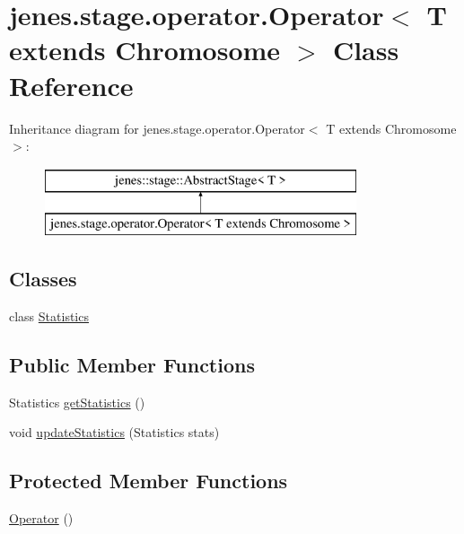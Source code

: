 \hypertarget{classjenes_1_1stage_1_1operator_1_1_operator_3_01_t_01extends_01_chromosome_01_4}{\section{jenes.\-stage.\-operator.\-Operator$<$ T extends Chromosome $>$ Class Reference}
\label{classjenes_1_1stage_1_1operator_1_1_operator_3_01_t_01extends_01_chromosome_01_4}
}
Inheritance diagram for jenes.\-stage.\-operator.\-Operator$<$ T extends Chromosome $>$\-:\begin{figure}[H]
\begin{center}
\leavevmode
\includegraphics[height=2.000000cm]{classjenes_1_1stage_1_1operator_1_1_operator_3_01_t_01extends_01_chromosome_01_4}
\end{center}
\end{figure}
\subsection*{Classes}
\begin{DoxyCompactItemize}
\item 
class \hyperlink{classjenes_1_1stage_1_1operator_1_1_operator_3_01_t_01extends_01_chromosome_01_4_1_1_statistics}{Statistics}
\end{DoxyCompactItemize}
\subsection*{Public Member Functions}
\begin{DoxyCompactItemize}
\item 
Statistics \hyperlink{classjenes_1_1stage_1_1operator_1_1_operator_3_01_t_01extends_01_chromosome_01_4_abf64e7c4d53509dd770fa09ca9cf377d}{get\-Statistics} ()
\item 
void \hyperlink{classjenes_1_1stage_1_1operator_1_1_operator_3_01_t_01extends_01_chromosome_01_4_a11ffd92acef6de663583899707cbbab9}{update\-Statistics} (Statistics stats)
\end{DoxyCompactItemize}
\subsection*{Protected Member Functions}
\begin{DoxyCompactItemize}
\item 
\hyperlink{classjenes_1_1stage_1_1operator_1_1_operator_3_01_t_01extends_01_chromosome_01_4_a23b4b18468c2fa30bd89fa9e962f6eb8}{Operator} ()
\end{DoxyCompactItemize}
